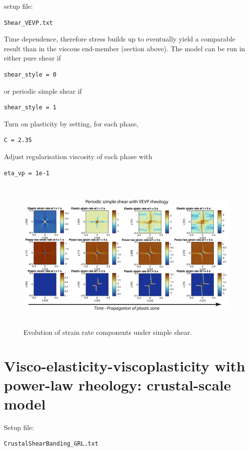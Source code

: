 \documentclass[12pt,english,openany]{scrbook}
\begin{document}
setup file:
\begin{verbatim} 
Shear_VEVP.txt
\end{verbatim}

Time dependence, therefore stress builds up to eventually yield a comparable result than in the viscous end-member (section above).
The model can be run in either pure shear if 
\begin{verbatim} 
shear_style = 0
\end{verbatim}

or periodic simple shear if 
\begin{verbatim} 
shear_style = 1
\end{verbatim}

Turn on plasticity by setting, for each phase,
\begin{verbatim} 
C = 2.35
\end{verbatim}

Adjust regularisation viscosity of each phase with
\begin{verbatim} 
eta_vp = 1e-1
\end{verbatim}

\begin{figure}[ht!]
\centerline{\includegraphics[height=3.0in]{./Figures/PeriodicSimpleShearVEVP_MDOODZ.png}}
\caption{Evolution of strain rate components under simple shear.}
\label{PeriodicSimpleShearVEVP_MDOODZ}
\end{figure}

\section{Visco-elasticity-viscoplasticity with power-law rheology: crustal-scale model}

Setup file:
\begin{verbatim} 
CrustalShearBanding_GRL.txt
\end{verbatim}
\end{document}
